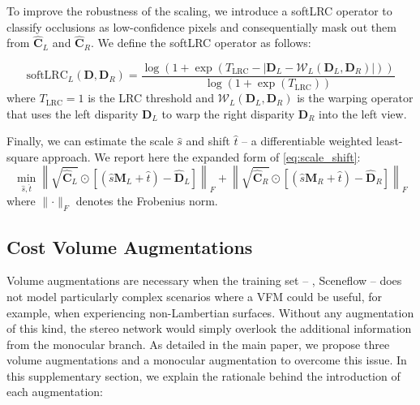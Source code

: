 To improve the robustness of the scaling, we introduce a softLRC operator to classify occlusions as low-confidence pixels and consequentially mask out them from $\hat{\mathbf{C}}_L$ and $\hat{\mathbf{C}}_R$.
We define the softLRC operator as follows:

\small\begin{equation}
    \text{softLRC}_L(\mathbf{D},\mathbf{D}_R) = \frac{\log\left(1+\exp\left(T_\text{LRC}-\left| \mathbf{D}_L - \mathcal{W}_L(\mathbf{D}_L,\mathbf{D}_R) \right|\right)\right)}{\log(1+\exp(T_\text{LRC}))}
    \label{eq:softlrc}
\end{equation}\normalsize
where $T_\text{LRC}=1$ is the LRC threshold and $\mathcal{W}_L(\mathbf{D}_L,\mathbf{D}_R)$ is the warping operator that uses the left disparity $\mathbf{D}_L$ to warp the right disparity $\mathbf{D}_R$ into the left view. 

Finally, we can estimate the scale $\hat{s}$ and shift $\hat{t}$  -- a differentiable weighted least-square approach. We report here the expanded form of \cref{eq:scale_shift}:
\small\begin{equation}
    \min_{\hat{s}, \hat{t}} \left\lVert \sqrt{\hat{\mathbf{C}}_L}\odot\left[\left(\hat{s}\mathbf{M}_L + \hat{t}\right)  - \hat{\mathbf{D}}_L \right] \right\rVert_F + \left\lVert \sqrt{\hat{\mathbf{C}}_R}\odot\left[\left(\hat{s}\mathbf{M}_R + \hat{t}\right)  - \hat{\mathbf{D}}_R \right] \right\rVert_F 
    \label{eq:scale_shift2}
\end{equation}\normalsize
where $\lVert\cdot\rVert_F$ denotes the Frobenius norm.

\subsection{Cost Volume Augmentations}
\label{subsec:cost_aug}

Volume augmentations are necessary when the training set -- \eg, Sceneflow \cite{mayer2016large} -- does not model particularly complex scenarios where a VFM could be useful, for example, when experiencing non-Lambertian surfaces.
Without any augmentation of this kind, the stereo network would simply overlook the additional information from the monocular branch.
As detailed in the main paper, we propose three volume augmentations and a monocular augmentation to overcome this issue.
In this supplementary section, we explain the rationale behind the introduction of each augmentation:

